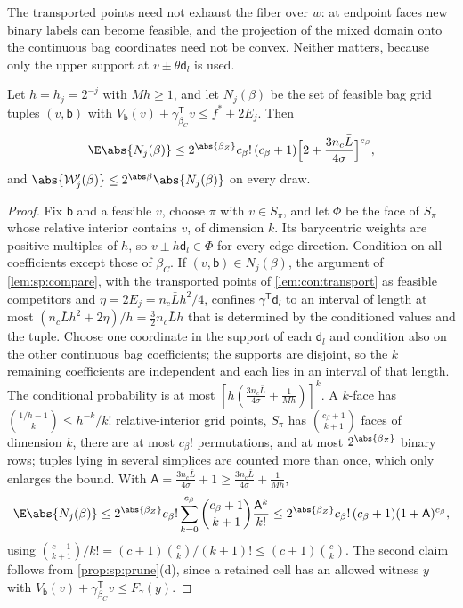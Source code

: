 The transported points need not exhaust the fiber over $w$: at endpoint faces
new binary labels can become feasible, and the projection of the mixed domain
onto the continuous bag coordinates need not be convex. Neither matters,
because only the upper support at $v\pm\theta\mathsf d_l$ is used.

\begin{proposition}\label{prop:con:order-count}
Let $h=h_j=2^{-j}$ with $Mh\ge1$, and let $N_j(\beta)$ be the set of feasible
bag grid tuples $(v,\mathsf b)$ with
$V_{\mathsf b}(v)+\gamma_{\beta_C}^{\mathsf T}v\le f^*+2E_j$. Then
\[
 \E\abs{N_j(\beta)}\le2^{\abs{\beta_Z}}c_\beta!\,(c_\beta+1)
 \Bigl[2+\frac{3n_c\bar L}{4\sigma}\Bigr]^{c_\beta},
\]
and $\abs{\mathcal W'_j(\beta)}\le2^{\abs\beta}\abs{N_j(\beta)}$ on every draw.
\end{proposition}

\begin{proof}
Fix $\mathsf b$ and a feasible $v$, choose $\pi$ with $v\in S_\pi$, and let
$\Phi$ be the face of $S_\pi$ whose relative interior contains $v$, of
dimension $k$. Its barycentric weights are positive multiples of $h$, so
$v\pm h\mathsf d_l\in\Phi$ for every edge direction. Condition on all
coefficients except those of $\beta_C$. If $(v,\mathsf b)\in N_j(\beta)$, the
argument of \cref{lem:sp:compare}, with the transported points of
\cref{lem:con:transport} as feasible competitors and $\eta=2E_j=n_c\bar Lh^2/4$,
confines $\gamma^{\mathsf T}\mathsf d_l$ to an interval of length at most
$(n_c\bar Lh^2+2\eta)/h=\frac32n_c\bar Lh$ that is determined by the
conditioned values and the tuple. Choose one coordinate in the support of
each $\mathsf d_l$ and condition also on the other continuous bag
coefficients; the supports are disjoint, so the $k$ remaining coefficients
are independent and each lies in an interval of that length. The conditional
probability is at most $[h(\frac{3n_c\bar L}{4\sigma}+\frac1{Mh})]^k$. A
$k$-face has $\binom{1/h-1}{k}\le h^{-k}/k!$ relative-interior grid points,
$S_\pi$ has $\binom{c_\beta+1}{k+1}$ faces of dimension $k$, there are at most
$c_\beta!$ permutations, and at most $2^{\abs{\beta_Z}}$ binary rows; tuples
lying in several simplices are counted more than once, which only enlarges
the bound. With $\mathsf A=\frac{3n_c\bar L}{4\sigma}+1\ge\frac{3n_c\bar
L}{4\sigma}+\frac1{Mh}$,
\[
 \E\abs{N_j(\beta)}\le2^{\abs{\beta_Z}}c_\beta!\sum_{k=0}^{c_\beta}
 \binom{c_\beta+1}{k+1}\frac{\mathsf A^k}{k!}
 \le2^{\abs{\beta_Z}}c_\beta!\,(c_\beta+1)(1+\mathsf A)^{c_\beta},
\]
using $\binom{c+1}{k+1}/k!=(c+1)\binom ck/(k+1)!\le(c+1)\binom ck$. The second
claim follows from \cref{prop:sp:prune}(d), since a retained cell has an
allowed witness $y$ with $V_{\mathsf b}(v)+\gamma_{\beta_C}^{\mathsf T}v\le
F_\gamma(y)$.
\end{proof}

